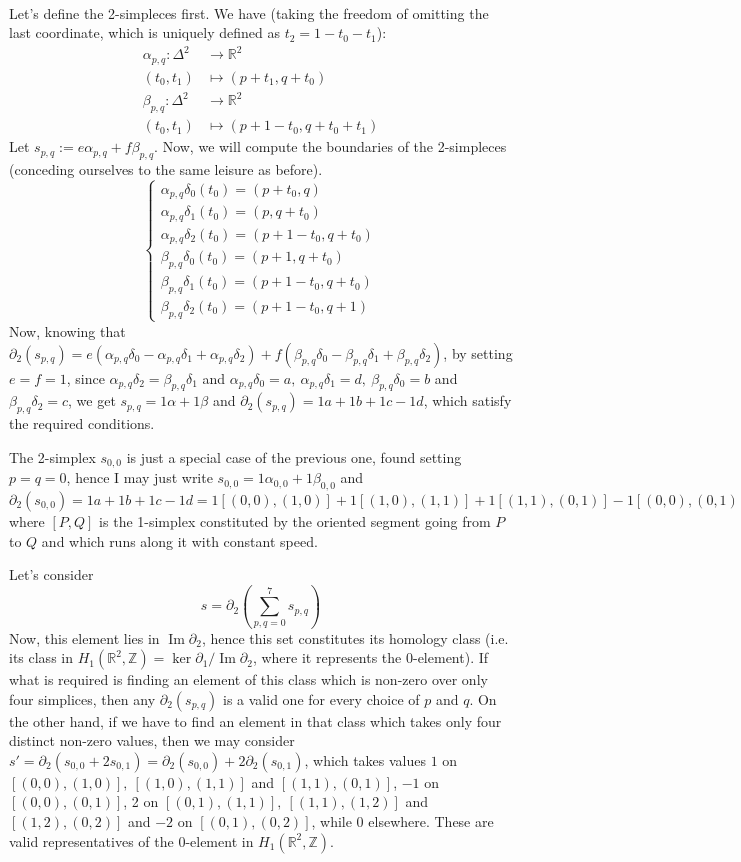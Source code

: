 \documentclass{article}
\newcommand{\numberset}{\mathbb}
\newcommand{\Z}{\numberset{Z}}
\newcommand{\R}{\numberset{R}}
\DeclareMathOperator{\Ima}{Im}
\newcommand{\exercise}[1]{\noindent {\bf Exercise #1}}
\begin{document}
~\\
\exercise{2}

Let's define the 2-simpleces first. We have (taking the freedom of omitting the last coordinate, which is uniquely defined as $t_2=1-t_0-t_1$):
\begin{align*}
		\alpha_{p,q}: \Delta^2 & \rightarrow \R^2 \\
		(t_0,t_1) & \mapsto (p+t_1,q+t_0) \\
		\beta_{p,q}: \Delta^2 & \rightarrow \R^2 \\
		(t_0,t_1) & \mapsto (p+1-t_0,q+t_0+t_1)
\end{align*}
Let $s_{p,q}:=e\alpha_{p,q}+f\beta_{p,q}$. Now, we will compute the boundaries of the 2-simpleces (conceding ourselves to the same leisure as before).
$$
\begin{cases}
		\alpha_{p,q}\delta_0(t_0)=(p+t_0,q) \\
		\alpha_{p,q}\delta_1(t_0)=(p,q+t_0) \\
		\alpha_{p,q}\delta_2(t_0)=(p+1-t_0,q+t_0) \\
		\beta_{p,q}\delta_0(t_0)=(p+1,q+t_0) \\
		\beta_{p,q}\delta_1(t_0)=(p+1-t_0,q+t_0) \\
		\beta_{p,q}\delta_2(t_0)=(p+1-t_0,q+1)
\end{cases}
$$
Now, knowing that $\partial_2(s_{p,q})=e(\alpha_{p,q}\delta_0-\alpha_{p,q}\delta_1+\alpha_{p,q}\delta_2)+f(\beta_{p,q}\delta_0-\beta_{p,q}\delta_1+\beta_{p,q}\delta_2)$, by setting $e=f=1$, since $\alpha_{p,q}\delta_2=\beta_{p,q}\delta_1$ and $\alpha_{p,q}\delta_0=a,\ \alpha_{p,q}\delta_1=d,\ \beta_{p,q}\delta_0=b$ and $\beta_{p,q}\delta_2=c$, we get $s_{p,q}=1\alpha+1\beta$ and $\partial_2(s_{p,q})=1a+1b+1c-1d$, which satisfy the required conditions.

The 2-simplex $s_{0,0}$ is just a special case of the previous one, found setting $p=q=0$, hence I may just write $s_{0,0}=1\alpha_{0,0}+1\beta_{0,0}$ and $\partial_2(s_{0,0})=1a+1b+1c-1d=1[(0,0),(1,0)]+1[(1,0),(1,1)]+1[(1,1),(0,1)]-1[(0,0),(0,1)]$ where $[P,Q]$ is the 1-simplex constituted by the oriented segment going from $P$ to $Q$ and which runs along it with constant speed.

Let's consider$$s=\partial_2(\sum_{p,q=0}^7 s_{p,q})$$
Now, this element lies in $\Ima\partial_2$, hence this set constitutes its homology class (i.e. its class in $H_1(\R^2,\Z)=\ker\partial_1/\Ima\partial_2$, where it represents the 0-element). If what is required is finding an element of this class which is non-zero over only four simplices, then any $\partial_2(s_{p,q})$ is a valid one for every choice of $p$ and $q$. On the other hand, if we have to find an element in that class which takes only four distinct non-zero values, then we may consider $s'=\partial_2(s_{0,0}+2s_{0,1})=\partial_2(s_{0,0})+2\partial_2(s_{0,1})$, which takes values $1$ on $[(0,0),(1,0)],\ [(1,0),(1,1)]$ and $[(1,1),(0,1)]$, $-1$ on $[(0,0),(0,1)]$, 2 on $[(0,1),(1,1)],\ [(1,1),(1,2)]$ and $[(1,2),(0,2)]$ and $-2$ on $[(0,1),(0,2)]$, while 0 elsewhere. These are valid representatives of the 0-element in $H_1(\R^2,\Z)$.
\end{document}
